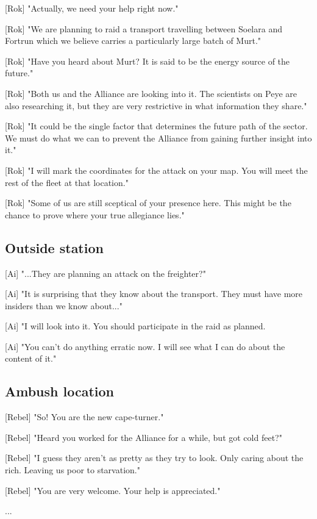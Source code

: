 \documentclass[a4paper,12pt]{article}
\begin{document}
[Rok] "Actually, we need your help right now." 

[Rok] "We are planning to raid a transport travelling between Soelara and Fortrun which
we believe carries a particularly large batch of Murt."

[Rok] "Have you heard about Murt? It is said to be the energy source of the future."

[Rok] "Both us and the Alliance are looking into it. The scientists on Peye are also researching it,
but they are very restrictive in what information they share."

[Rok] "It could be the single factor that determines the future path of the sector. We must
do what we can to prevent the Alliance from gaining further insight into it."

[Rok] "I will mark the coordinates for the attack on your map. You will meet the rest of the
fleet at that location."

[Rok] "Some of us are still sceptical of your presence here. This might be
the chance to prove where your true allegiance lies."

\subsection{Outside station}

[Ai] "...They are planning an attack on the freighter?" 

[Ai] "It is surprising that they know about the transport. They must have more insiders than we know about..."

[Ai] "I will look into it. You should participate in the raid as planned. 

[Ai] "You can't do anything erratic now. I will see what I can do about the content of it."

\subsection{Ambush location}

[Rebel] "So! You are the new cape-turner."

[Rebel] "Heard you worked for the Alliance for a while, but got cold feet?" 

[Rebel] "I guess they aren't as pretty as they try to look. Only caring about the rich. 
Leaving us poor to starvation."

[Rebel] "You are very welcome. Your help is appreciated."

...
\end{document}
